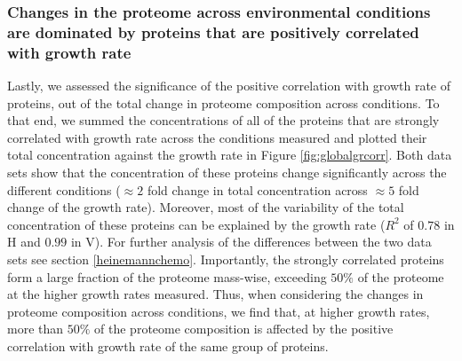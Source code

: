 \subsubsection{Changes in the proteome across environmental conditions are dominated by proteins that are positively correlated with growth rate}
Lastly, we assessed the significance of the positive correlation with growth rate of proteins, out of the total change in proteome composition across conditions.
To that end, we summed the concentrations of all of the proteins that are strongly correlated with growth rate across the conditions measured and plotted their total concentration against the growth rate in Figure \ref{fig:globalgrcorr}.
Both data sets show that the concentration of these proteins change significantly across the different conditions ($\approx 2$ fold change in total concentration across $\approx 5$ fold change of the growth rate).
Moreover, most of the variability of the total concentration of these proteins can be explained by the growth rate ($R^2$ of $0.78$ in H and $0.99$ in V). 
For further analysis of the differences between the two data sets see section \ref{heinemannchemo}.
Importantly, the strongly correlated proteins form a large fraction of the proteome mass-wise, exceeding $50\%$ of the proteome at the higher growth rates measured.
Thus, when considering the changes in proteome composition across conditions, we find that, at higher growth rates, more than $50\%$ of the proteome composition is affected by the positive correlation with growth rate of the same group of proteins.
